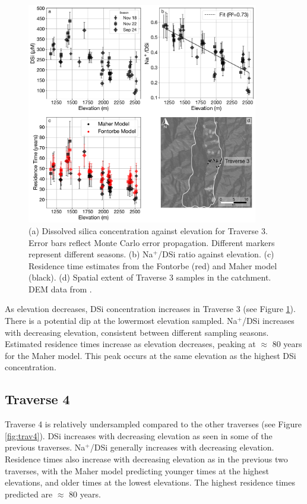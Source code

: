 \begin{figure}[h]
    \centering
        \includegraphics[width=0.9\textwidth]{Traverse_3_summary.pdf}
    \caption{(a) Dissolved silica concentration against elevation for Traverse 3. Error bars reflect Monte Carlo error propagation. Different markers represent different seasons. (b) Na$^+$/DSi ratio against elevation. (c) Residence time estimates from the Fontorbe (red) and Maher model (black). (d) Spatial extent of Traverse 3 samples in the catchment. DEM data from \textcite{asterGlobalDigitalElevation2018}.}
    \label{fig:trav3}
\end{figure}

\FloatBarrier
As elevation decreases, DSi concentration increases in Traverse 3 (see Figure \ref{fig:trav3}). There is a potential dip at the lowermost elevation sampled. Na$^+$/DSi increases with decreasing elevation, consistent between different sampling seasons. Estimated residence times increase as elevation decreases, peaking at $\approx$ 80 years for the Maher model. This peak occurs at the same elevation as the highest DSi concentration.



\subsection{Traverse 4}

Traverse 4 is relatively undersampled compared to the other traverses (see Figure \ref{fig:trav4}). DSi increases with decreasing elevation as seen in some of the previous traverses. Na$^+$/DSi generally increases with decreasing elevation. Residence times also increase with decreasing elevation as in the previous two traverses, with the Maher model predicting younger times at the highest elevations, and older times at the lowest elevations. The highest residence times predicted are $\approx$ 80 years.

